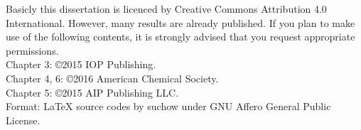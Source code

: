 
 Basicly this dissertation is licenced by Creative Commons Attribution 4.0 International. However, many results are already published. If you plan to make use of the following contents, it is strongly advised that you request appropriate permissions. \\
 Chapter 3: \copyright 2015 IOP Publishing. \\
 Chapter 4, 6: \copyright 2016 American Chemical Society. \\
 Chapter 5: \copyright 2015 AIP Publishing LLC. \\
 Format: \LaTeX \xspace source codes by suchow under GNU Affero General Public License. 
